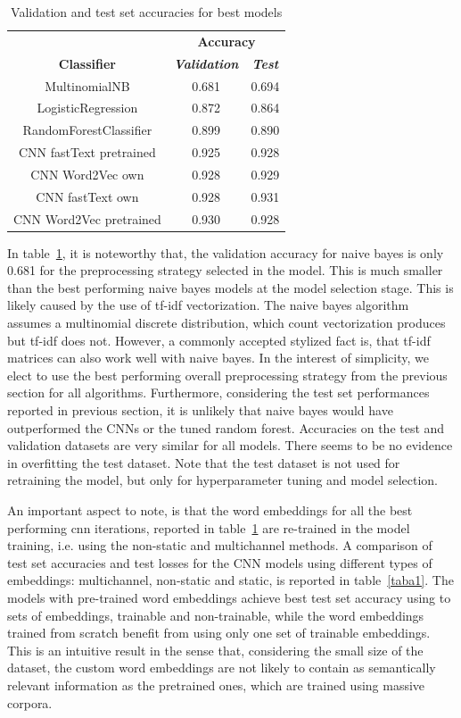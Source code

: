 \documentclass[conference]{IEEEtran}
\begin{document}
\begin{table}[htbp]
\caption{Validation and test set accuracies for best models}
\begin{center}
\begin{tabular}{|c|c|c|}
\hline
\textbf{}&\multicolumn{2}{|c|}{\textbf{Accuracy}} \\ 
\cline{2-3}
\textbf{Classifier} & \textbf{\textit{Validation}}& \textbf{\textit{Test}} \\ 
\hline
MultinomialNB & 0.681 & 0.694 \\ 
\hline
LogisticRegression & 0.872 & 0.864 \\ 
\hline
RandomForestClassifier & 0.899 & 0.890 \\ 
\hline
CNN fastText pretrained & 0.925 & 0.928 \\ 
\hline
CNN Word2Vec own & 0.928 & 0.929 \\ 
\hline
CNN fastText own & 0.928 & 0.931 \\ 
\hline
CNN Word2Vec pretrained & 0.930 & 0.928 \\ 
\hline
\end{tabular}
\label{tabval}
\end{center}
\end{table}

In table~\ref{tabval}, it is noteworthy that, the validation accuracy for naive bayes is only 0.681 for the preprocessing strategy selected in the model. This is much smaller than the best performing naive bayes models at the model selection stage. This is likely caused by the use of tf-idf vectorization. The naive bayes algorithm assumes  a multinomial discrete distribution, which count vectorization produces but tf-idf does not. However, a commonly accepted stylized fact is, that tf-idf matrices can also work well with naive bayes. In the interest of simplicity, we elect to use the best performing overall preprocessing strategy from the previous section for all algorithms. Furthermore, considering the test set performances reported in previous section, it is unlikely that naive bayes would have outperformed the CNNs or the tuned random forest. Accuracies on the test and validation datasets are very similar for all models. There seems to be no evidence in overfitting the test dataset. Note that the test dataset is not used for retraining the model, but only for hyperparameter tuning and model selection.

An important aspect to note, is that the word embeddings for all the best performing cnn iterations, reported in table~\ref{tabval} are re-trained in the model training, i.e. using the non-static and multichannel methods. A comparison of test set accuracies and test losses for the CNN models using different types of embeddings: multichannel, non-static and static, is reported in table~\ref{taba1}. The models with pre-trained word embeddings achieve best test set accuracy using to sets of embeddings, trainable and non-trainable, while the word embeddings trained from scratch benefit from using only one set of trainable embeddings. This is an intuitive result in the sense that, considering the small size of the dataset, the custom word embeddings are not likely to contain as semantically relevant information as the pretrained ones, which are trained using massive corpora.
\end{document}
